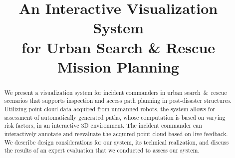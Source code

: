 \documentclass[conference,10pt,letter]{IEEEtran}
\begin{document}
\title{An Interactive Visualization System \\%
for Urban Search \& Rescue Mission Planning}

\author{
    \and
    \and
    \and
}


\maketitle


\begin{abstract}
We present a visualization system for incident commanders in urban search~\&~rescue scenarios that supports inspection and access path planning in post-disaster structures. Utilizing point cloud data acquired from unmanned robots, the system allows for assessment of automatically generated paths, whose computation is based on varying risk factors, in an interactive 3D environment. The incident commander  can interactively annotate and reevaluate the acquired point cloud based on live feedback. We describe design considerations for our system, its technical realization, and discuss the results of an expert evaluation that we conducted to assess our system.
\end{abstract}
\end{document}
